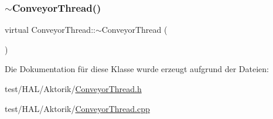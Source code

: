 \hypertarget{class_conveyor_thread_a5b1ce529cc5e10c9b97a81c621b61f1c}{}\label{class_conveyor_thread_a5b1ce529cc5e10c9b97a81c621b61f1c} 
\subsubsection{\texorpdfstring{$\sim$\+Conveyor\+Thread()}{~ConveyorThread()}\hspace{0.1cm}{\footnotesize\ttfamily [2/2]}}
{\footnotesize\ttfamily virtual Conveyor\+Thread\+::$\sim$\+Conveyor\+Thread (\begin{DoxyParamCaption}{ }\end{DoxyParamCaption})\hspace{0.3cm}{\ttfamily [virtual]}}



Die Dokumentation für diese Klasse wurde erzeugt aufgrund der Dateien\+:\begin{DoxyCompactItemize}
\item 
test/\+H\+A\+L/\+Aktorik/\hyperlink{test_2_h_a_l_2_aktorik_2_conveyor_thread_8h}{Conveyor\+Thread.\+h}\item 
test/\+H\+A\+L/\+Aktorik/\hyperlink{test_2_h_a_l_2_aktorik_2_conveyor_thread_8cpp}{Conveyor\+Thread.\+cpp}\end{DoxyCompactItemize}

